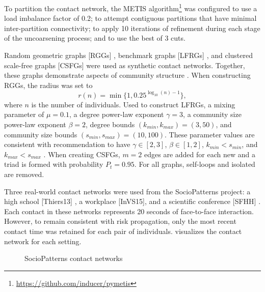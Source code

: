 To partition the contact network, the METIS algorithm\footnote{\url{https://github.com/inducer/pymetis}} \citep{Karypis1998} was configured to use a load imbalance factor of \num{0.2}; to attempt contiguous partitions that have minimal inter-partition connectivity; to apply \num{10} iterations of refinement during each stage of the uncoarsening process; and to use the best of \num{3} cuts.

Random geometric graphs [RGGs] \citep{Dall2002}, benchmark graphs [LFRGs] \citep{Lancichinetti2008}, and clustered scale-free graphs [CSFGs] \citep{Holme2002} were used as synthetic contact networks. Together, these graphs demonstrate aspects of community structure \citep{Fortunato2010}. When constructing RGGs, the radius was set to
\begin{equation*}
  r(n) = \min \{\num{1}, \num{0.25}^{\log_{10}(n) - 1}\},
\end{equation*}
where $n$ is the number of individuals. Used to construct LFRGs, a mixing parameter of $\mu = \num{0.1}$, a degree power-law exponent $\gamma = \num{3}$, a community size power-law exponent $\beta = \num{2}$, degree bounds $(k_\mathit{min}, k_\mathit{max}) = (\num{3}, \num{50})$, and community size bounds $(s_\mathit{min}, s_\mathit{max}) = (\num{10}, \num{100})$. These parameter values are consistent with recommendation to have $\gamma \in [\num{2}, \num{3}]$,  $\beta \in [\num{1}, \num{2}]$, $k_\mathit{min} < s_\mathit{min}$, and $k_\mathit{max} < s_\mathit{max}$ \citep{Lancichinetti2008}. When creating CSFGs, $m = \num{2}$ edges are added for each new \vertexName and a triad is formed with probability $P_t = \num{0.95}$. For all graphs, self-loops and isolated \verticesName are removed.

Three real-world contact networks were used from the SocioPatterns project: a high school [Thiers13] \citep{Fournet2014}, a workplace [InVS15], and a scientific conference [SFHH] \citep{G_enois2018}. Each contact in these networks represents \num{20} seconds of face-to-face interaction. However, to remain consistent with risk propagation, only the most recent contact time was retained for each pair of individuals. visualizes the contact network for each setting.

\begin{figure}[htbp]
\centering
{}
\caption{SocioPatterns contact networks}
\label{fig:real-networks}
\end{figure}

